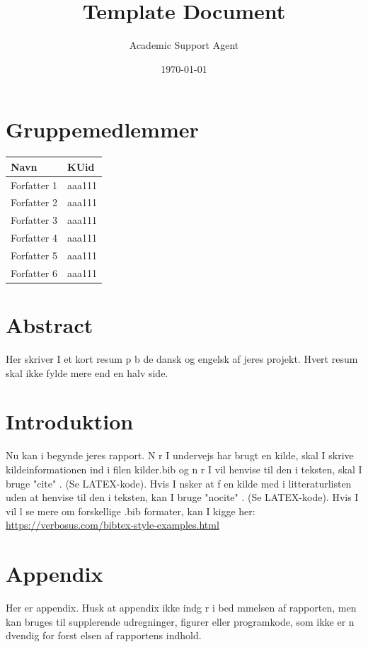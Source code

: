 \documentclass{article}
\title{Template Document}
\author{Academic Support Agent}
\date{\today}
\begin{document}
\maketitle

\maketitle
\newpage

\section*{Gruppemedlemmer}
\begin{center}
\begin{tabular}{ p{5cm} |p{1.5cm} }
 \centering Navn &   KUid \\ \hline
 Forfatter 1 & aaa111  \\ \hline 
 Forfatter 2 & aaa111  \\ \hline 
 Forfatter 3 & aaa111  \\ \hline 
 Forfatter 4 & aaa111  \\ \hline 
 Forfatter 5 & aaa111  \\ \hline 
 Forfatter 6 & aaa111  \\ \hline 
\end{tabular}
\end{center}

\section*{Abstract}
Her skriver I et kort resum  p  b de dansk og engelsk af jeres projekt. Hvert resum  skal ikke fylde mere end en halv side. 

\newpage



\newpage

\section{Introduktion}

Nu kan i begynde jeres rapport. 
N r I undervejs har brugt en kilde, skal I skrive kildeinformationen ind i filen kilder.bib og n r I vil henvise til den i teksten,  skal I bruge "cite" \cite{bog1}. (Se LATEX-kode). Hvis I  nsker at f  en kilde med i litteraturlisten uden at henvise til den i teksten, kan I bruge "nocite" \nocite{hjemmseide1}. (Se LATEX-kode).  Hvis I vil l se mere om forskellige .bib formater, kan I kigge her: \href{https://verbosus.com/bibtex-style-examples.html}{https://verbosus.com/bibtex-style-examples.html}



\section{Appendix}
Her er appendix. Husk at appendix ikke indg r i bed mmelsen af rapporten, men kan  bruges  til  
supplerende  udregninger,  figurer  eller  programkode, som  ikke  er n dvendig for forst elsen 
af rapportens indhold.
\end{document}
